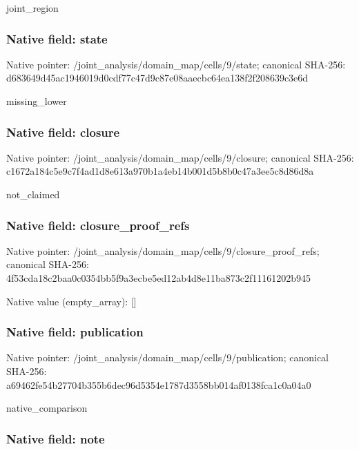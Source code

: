 \documentclass[10pt,a4paper]{article}
\begin{document}
joint\_region


\subsubsection{Native field: state}


Native pointer: /joint\_analysis/domain\_m\allowbreak{}ap/cells/9/state; canonical SHA-256: d683649d45ac1946019d0cdf\allowbreak{}77c47d9c87e08aaecbc64ea1\allowbreak{}38f2f208639c3e6d


missing\_lower


\subsubsection{Native field: closure}


Native pointer: /joint\_analysis/domain\_m\allowbreak{}ap/cells/9/closure; canonical SHA-256: c1672a184c5e9c7f4ad1d8e6\allowbreak{}13a970b1a4eb14b001d5b8b0\allowbreak{}c47a3ee5c8d86d8a


not\_claimed


\subsubsection{Native field: closure\_proof\_refs}


Native pointer: /joint\_analysis/domain\_m\allowbreak{}ap/cells/9/closure\_proof\allowbreak{}\_refs; canonical SHA-256: 4f53cda18c2baa0c0354bb5f\allowbreak{}9a3ecbe5ed12ab4d8e11ba87\allowbreak{}3c2f11161202b945



Native value (empty\_array): []



\subsubsection{Native field: publication}


Native pointer: /joint\_analysis/domain\_m\allowbreak{}ap/cells/9/publication; canonical SHA-256: a69462fe54b27704b355b6de\allowbreak{}c96d5354e1787d3558bb014a\allowbreak{}f0138fca1c0a04a0


native\_comparison


\subsubsection{Native field: note}
\end{document}
